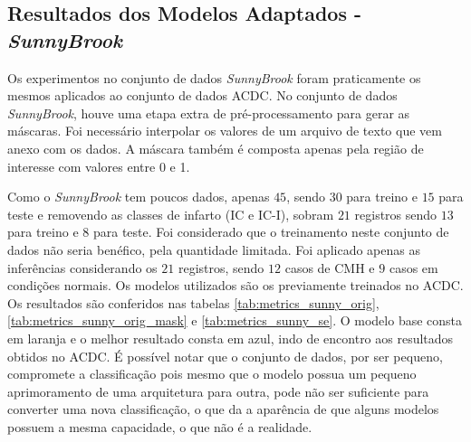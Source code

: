 \subsection{Resultados dos Modelos Adaptados - \textit{SunnyBrook}}
\label{subsec:resultados_sunny_adaptado}

Os experimentos no conjunto de dados \textit{SunnyBrook} foram praticamente os mesmos aplicados ao conjunto de dados \gls{ACDC}. No conjunto de dados \textit{SunnyBrook}, houve uma etapa extra de pré-processamento para gerar as máscaras. Foi necessário interpolar os valores de um arquivo de texto que vem anexo com os dados. A máscara também é composta apenas pela região de interesse com valores entre 0 e 1.

Como o \textit{SunnyBrook} tem poucos dados, apenas $45$, sendo $30$ para treino e $15$ para teste e removendo as classes de infarto (IC e IC-I), sobram $21$ registros sendo $13$ para treino e $8$ para teste. Foi considerado que o treinamento neste conjunto de dados não seria benéfico, pela quantidade limitada. Foi aplicado apenas as inferências considerando os $21$ registros, sendo $12$ casos de \gls{CMH} e $9$ casos em condições normais. Os modelos utilizados são os previamente treinados no \gls{ACDC}. Os resultados são conferidos nas tabelas \ref{tab:metrics_sunny_orig}, \ref{tab:metrics_sunny_orig_mask} e \ref{tab:metrics_sunny_se}. O modelo base consta em laranja e o melhor resultado consta em azul, indo de encontro aos resultados obtidos no \gls{ACDC}. É possível notar que o conjunto de dados, por ser pequeno, compromete a classificação pois mesmo que o modelo possua um pequeno aprimoramento de uma arquitetura para outra, pode não ser suficiente para converter uma nova classificação, o que da a aparência de que alguns modelos possuem a mesma capacidade, o que não é a realidade.


